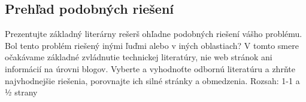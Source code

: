 \subsection{Prehľad podobných riešení}
Prezentujte základný literárny rešerš ohľadne podobných riešení vášho problému. Bol tento problém riešený inými ľuďmi alebo v iných oblastiach? V tomto smere očakávame základné zvládnutie technickej literatúry, nie web stránok ani informácií na úrovni blogov. Vyberte a vyhodnoťte odbornú literatúru a zhrňte najvhodnejšie riešenia, porovnajte ich silné stránky a obmedzenia.  Rozsah: 1-1 a ½ strany
